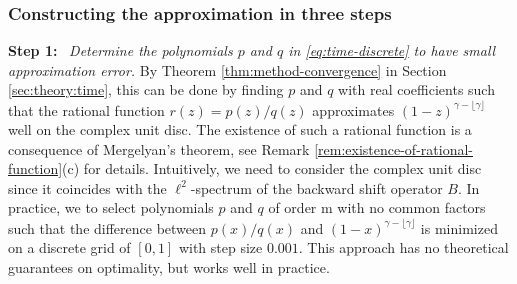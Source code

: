\documentclass[12pt]{article} %
\begin{document}
\subsubsection{Constructing the approximation in three steps}


\noindent \textbf{Step 1:} \
{\em Determine the polynomials $p$ and $q$  in \eqref{eq:time-discrete} to have small approximation error.%
} By
Theorem \ref{thm:method-convergence} in Section \ref{sec:theory:time}, this can be done by finding $p$ and $q$ with real coefficients such that the rational function $r(z) = p(z)/q(z)$ approximates $(1-z)^{\gamma-\lfloor\gamma\rfloor}$ well on the complex unit disc. The existence of such a rational function is a consequence of Mergelyan's theorem, see Remark \ref{rem:existence-of-rational-function}(c) for details. Intuitively, we need to consider the complex unit disc since it coincides with the $\ell^2$-spectrum  of the backward shift operator $B$. In practice, we to 
select polynomials $p$ and $q$ of order m with no common factors such that the difference between $p(x)/q(x)$ and $(1-x)^{\gamma-\lfloor \gamma \rfloor}$ is minimized on a discrete grid of $[0, 1]$ with step size $0.001$. This approach has no theoretical guarantees on optimality, but works well in practice.\medskip
\end{document}
